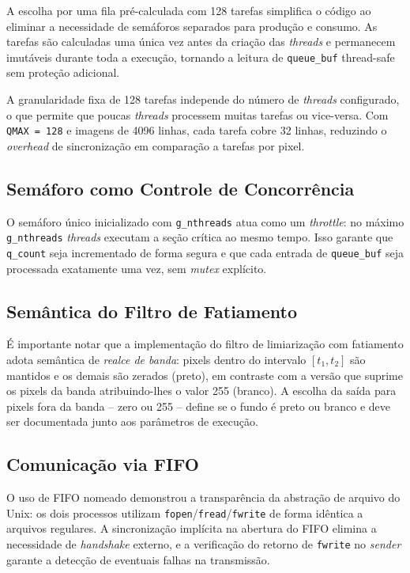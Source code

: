 \documentclass[12 pt]{abntex2}
\begin{document}
A escolha por uma fila pré-calculada com 128 tarefas simplifica o código ao
eliminar a necessidade de semáforos separados para produção e consumo. As
tarefas são calculadas uma única vez antes da criação das \textit{threads} e
permanecem imutáveis durante toda a execução, tornando a leitura de
\texttt{queue\_buf} thread-safe sem proteção adicional.
 
A granularidade fixa de 128 tarefas independe do número de \textit{threads}
configurado, o que permite que poucas \textit{threads} processem muitas
tarefas ou vice-versa. Com \texttt{QMAX = 128} e imagens de 4096 linhas, cada
tarefa cobre 32 linhas, reduzindo o \textit{overhead} de sincronização em
comparação a tarefas por pixel.
 
\subsection{Semáforo como Controle de Concorrência}
 
O semáforo único inicializado com \texttt{g\_nthreads} atua como um
\textit{throttle}: no máximo \texttt{g\_nthreads} \textit{threads} executam
a seção crítica ao mesmo tempo. Isso garante que \texttt{q\_count} seja
incrementado de forma segura e que cada entrada de \texttt{queue\_buf} seja
processada exatamente uma vez, sem \textit{mutex} explícito.
 
\subsection{Semântica do Filtro de Fatiamento}
 
É importante notar que a implementação do filtro de limiarização com
fatiamento adota semântica de \textit{realce de banda}: pixels dentro do
intervalo $[t_1, t_2]$ são mantidos e os demais são zerados (preto), em
contraste com a versão que suprime os pixels da banda atribuindo-lhes o
valor 255 (branco). A escolha da saída para pixels fora da banda -- zero ou
255 -- define se o fundo é preto ou branco e deve ser documentada junto aos
parâmetros de execução.
 
\subsection{Comunicação via FIFO}
 
O uso de FIFO nomeado demonstrou a transparência da abstração de arquivo do
Unix: os dois processos utilizam \texttt{fopen}/\texttt{fread}/\texttt{fwrite}
de forma idêntica a arquivos regulares. A sincronização implícita na abertura
do FIFO elimina a necessidade de \textit{handshake} externo, e a verificação
do retorno de \texttt{fwrite} no \textit{sender} garante a detecção de
eventuais falhas na transmissão.
\end{document}
